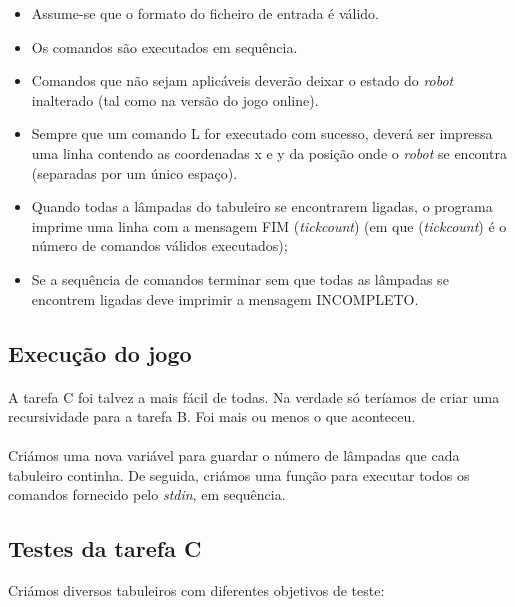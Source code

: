 \documentclass[a4paper,12pt]{article}
\begin{document}
\begin{itemize}

\item Assume-se que o formato do ficheiro de entrada é válido.

\item Os comandos são executados em sequência.

\item Comandos que não sejam aplicáveis deverão deixar o estado do \emph{robot} inalterado (tal como na versão do jogo online).

\item Sempre que um comando L for executado com sucesso, deverá ser impressa uma linha contendo as coordenadas x e y da posição onde o \emph{robot} se encontra (separadas por um único espaço).

\item Quando todas a lâmpadas do tabuleiro se encontrarem ligadas, o programa imprime uma linha com a mensagem FIM (\emph{tickcount}) (em que (\emph{tickcount}) é o número de comandos válidos executados);

\item Se a sequência de comandos terminar sem que todas as lâmpadas se encontrem ligadas deve imprimir a mensagem INCOMPLETO.

\end{itemize}

\subsection{Execução do jogo}

\paragraph{}
A tarefa C foi talvez a mais fácil de todas. Na verdade só teríamos de criar uma recursividade para a tarefa B. Foi mais ou menos o que aconteceu.

\paragraph{}
Criámos uma nova variável para guardar o número de lâmpadas que cada tabuleiro continha. De seguida, criámos uma função para executar todos os comandos fornecido pelo \emph{stdin}, em sequência.

\subsection{Testes da tarefa C}
Criámos diversos tabuleiros com diferentes objetivos de teste:
\end{document}

